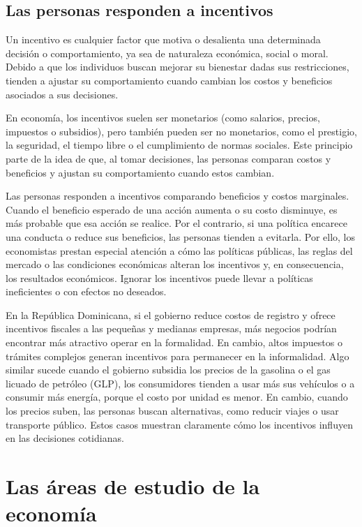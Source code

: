 \documentclass[
  letterpaper,
  DIV=11,
  numbers=noendperiod,
  oneside]{scrreprt}
\begin{document}
\subsection{Las personas responden a
incentivos}\label{las-personas-responden-a-incentivos}

Un incentivo es cualquier factor que motiva o desalienta una determinada
decisión o comportamiento, ya sea de naturaleza económica, social o
moral. Debido a que los individuos buscan mejorar su bienestar dadas sus
restricciones, tienden a ajustar su comportamiento cuando cambian los
costos y beneficios asociados a sus decisiones.

En economía, los incentivos suelen ser monetarios (como salarios,
precios, impuestos o subsidios), pero también pueden ser no monetarios,
como el prestigio, la seguridad, el tiempo libre o el cumplimiento de
normas sociales. Este principio parte de la idea de que, al tomar
decisiones, las personas comparan costos y beneficios y ajustan su
comportamiento cuando estos cambian.

Las personas responden a incentivos comparando beneficios y costos
marginales. Cuando el beneficio esperado de una acción aumenta o su
costo disminuye, es más probable que esa acción se realice. Por el
contrario, si una política encarece una conducta o reduce sus
beneficios, las personas tienden a evitarla. Por ello, los economistas
prestan especial atención a cómo las políticas públicas, las reglas del
mercado o las condiciones económicas alteran los incentivos y, en
consecuencia, los resultados económicos. Ignorar los incentivos puede
llevar a políticas ineficientes o con efectos no deseados.

En la República Dominicana, si el gobierno reduce costos de registro y
ofrece incentivos fiscales a las pequeñas y medianas empresas, más
negocios podrían encontrar más atractivo operar en la formalidad. En
cambio, altos impuestos o trámites complejos generan incentivos para
permanecer en la informalidad. Algo similar sucede cuando el gobierno
subsidia los precios de la gasolina o el gas licuado de petróleo (GLP),
los consumidores tienden a usar más sus vehículos o a consumir más
energía, porque el costo por unidad es menor. En cambio, cuando los
precios suben, las personas buscan alternativas, como reducir viajes o
usar transporte público. Estos casos muestran claramente cómo los
incentivos influyen en las decisiones cotidianas.

\section{Las áreas de estudio de la
economía}\label{las-uxe1reas-de-estudio-de-la-economuxeda}
\end{document}
